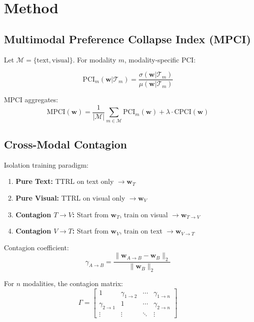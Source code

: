 \documentclass[11pt,a4paper]{article}
\begin{document}
\section{Method}

\subsection{Multimodal Preference Collapse Index (MPCI)}
Let $\mathcal{M} = \{\text{text}, \text{visual}\}$. For modality $m$, modality-specific PCI:

\begin{equation}
\text{PCI}_m(\mathbf{w} | \mathcal{T}_m) = \frac{\sigma(\mathbf{w} | \mathcal{T}_m)}{\mu(\mathbf{w} | \mathcal{T}_m)}
\end{equation}

MPCI aggregates:
\begin{equation}
\text{MPCI}(\mathbf{w}) = \frac{1}{|\mathcal{M}|} \sum_{m \in \mathcal{M}} \text{PCI}_m(\mathbf{w}) + \lambda \cdot \text{CPCI}(\mathbf{w})
\end{equation}

\subsection{Cross-Modal Contagion}
Isolation training paradigm:

\begin{enumerate}[leftmargin=*, label=\textbf{Phase \arabic*}:]
    \item \textbf{Pure Text:} TTRL on text only $\rightarrow \mathbf{w}_T$
    \item \textbf{Pure Visual:} TTRL on visual only $\rightarrow \mathbf{w}_V$
    \item \textbf{Contagion $T\to V$:} Start from $\mathbf{w}_T$, train on visual $\rightarrow \mathbf{w}_{T\to V}$
    \item \textbf{Contagion $V\to T$:} Start from $\mathbf{w}_V$, train on text $\rightarrow \mathbf{w}_{V\to T}$
\end{enumerate}

Contagion coefficient:
\begin{equation}
\gamma_{A\to B} = \frac{\|\mathbf{w}_{A\to B} - \mathbf{w}_B\|_2}{\|\mathbf{w}_B\|_2}
\end{equation}

For $n$ modalities, the contagion matrix:
\begin{equation}
\Gamma = \begin{bmatrix}
1 & \gamma_{1\to 2} & \cdots & \gamma_{1\to n} \\
\gamma_{2\to 1} & 1 & \cdots & \gamma_{2\to n} \\
\vdots & \vdots & \ddots & \vdots
\end{bmatrix}
\end{equation}
\end{document}
